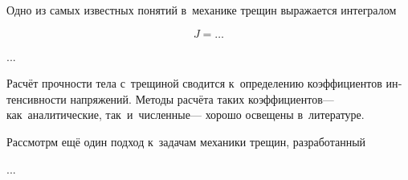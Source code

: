 






\begin{otherlanguage}{russian}

Одно из самых известных понятий в~механике трещин выражается интегралом

\nopagebreak\vspace{-0.2em}\begin{equation}
J = \ldots
\end{equation}

...



\end{otherlanguage}



\begin{otherlanguage}{russian}

Расчёт прочности тела с~трещиной сводится к~определению коэффициентов интенсивности напряжений. Методы расчёта таких коэффициентов\:--- как~аналитические, так~и~численные\:--- хорошо освещены в~литературе.

Рассмотрм ещё один подход к~задачам механики трещин, разработанный

...



\end{otherlanguage}

